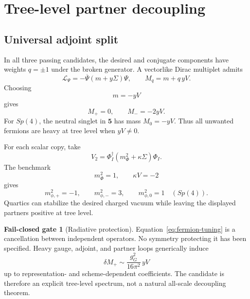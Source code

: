 \documentclass[11pt]{article}
\theoremstyle{definition}
\newtheorem{gate}[theorem]{Fail-closed gate}
\theoremstyle{remark}
\begin{document}
\section{Tree-level partner decoupling}

\subsection{Universal adjoint split}

In all three passing candidates, the desired and conjugate components have
weights \(q=\pm1\) under the broken generator.  A vectorlike Dirac multiplet
admits
\begin{equation}
 \mathcal L_{\Psi}
 =-\overline\Psi(m+y\Sigma)\Psi,
 \qquad
 M_q=m+q\,yV.
 \label{eq:fermion-masses}
\end{equation}
Choosing
\begin{equation}
 m=-yV
 \label{eq:fermion-tuning}
\end{equation}
gives
\begin{equation}
 M_{+}=0,\qquad M_{-}=-2yV.
 \label{eq:fermion-split}
\end{equation}
For \(Sp(4)\), the neutral singlet in \(\bm5\) has mass \(M_0=-yV\).  Thus
all unwanted fermions are heavy at tree level when \(yV\ne0\).

For each scalar copy, take
\begin{equation}
 V_2=\Phi_I^\dagger(m_\Phi^2+\kappa\Sigma)\Phi_I.
 \label{eq:scalar-masses}
\end{equation}
The benchmark
\begin{equation}
 m_\Phi^2=1,\qquad \kappa V=-2
 \label{eq:scalar-benchmark}
\end{equation}
gives
\begin{equation}
 m^2_{\phi,+}=-1,\qquad
 m^2_{\phi,-}=3,
 \qquad
 m^2_{\phi,0}=1\quad(Sp(4)).
 \label{eq:scalar-split}
\end{equation}
Quartics can stabilize the desired charged vacuum while leaving the displayed
partners positive at tree level.

\begin{gate}[Radiative protection]
Equation~\eqref{eq:fermion-tuning} is a cancellation between independent
operators.  No symmetry protecting it has been specified.  Heavy gauge,
adjoint, and partner loops generically induce
\begin{equation}
 \delta M_+\sim\frac{g_G^2}{16\pi^2}\,yV
 \label{eq:threshold-estimate}
\end{equation}
up to representation- and scheme-dependent coefficients.  The candidate is
therefore an explicit tree-level spectrum, not a natural all-scale
decoupling theorem.
\end{gate}
\end{document}
